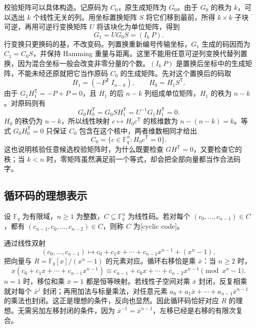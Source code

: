 \ProseParagraphBreak
校验矩阵可以具体构造。记原码为 \(C_0\)，原生成矩阵为 \(G_0\)。由于 \(G_0\) 的秩为 \(k\)，可以选出 \(k\) 个线性无关的列。用坐标置换矩阵 \(S\) 将它们移到最前，所得 \(k\times k\) 子块可逆，再用可逆行变换矩阵 \(U\) 将该块化为单位矩阵，得到
\[
	G_1=UG_0S=(I_k\ P).
\]
行变换只更换码的基，不改变码。列置换重新编号传输坐标，\(G_1\) 生成的码因而为 \(C_1=C_0S\)，并保持 Hamming 重量与距离。这里不能用任意可逆列变换代替列置换，因为混合坐标一般会改变非零分量的个数。\((I_k\ P)\) 是置换后坐标中的生成矩阵，不能未经还原就把它当作原码 \(C_0\) 的生成矩阵。先对这个置换后的码取
\[
	H_1=(-P^{\mathsf T}\ I_{n-k}),\qquad H_0=H_1S^{\mathsf T}.
\]
由于 \(G_1H_1^{\mathsf T}=-P+P=0\)，且 \(H_1\) 的后 \(n-k\) 列组成单位矩阵，\(H_1\) 的秩为 \(n-k\)。对原码则有
\[
	G_0H_0^{\mathsf T}=G_0SH_1^{\mathsf T}=U^{-1}G_1H_1^{\mathsf T}=0.
\]
\(H_0\) 的秩仍为 \(n-k\)，所以线性映射 \(c\mapsto H_0c^{\mathsf T}\) 的核维数为 \(n-(n-k)=k\)。等式 \(G_0H_0^{\mathsf T}=0\) 只保证 \(C_0\) 包含在这个核中，两者维数相同才给出
\[
	C_0=\{c\in\mathbb F_q^n:H_0c^{\mathsf T}=0\}.
\]
这也说明核验任意候选校验矩阵时，为什么既要检查 \(GH^{\mathsf T}=0\)，又要检查它的秩；当 \(k<n\) 时，零矩阵虽然满足前一个等式，却会把全部向量都当作合法码字。

\subsection{循环码的理想表示}
\label{b1:subsec:B02:02}

\begin{definition}\label{b1:def:B-cyclic-code}
	设 \(\mathbb F_q\) 为有限域，\(n\geq1\) 为整数，\(C\subseteq\mathbb F_q^n\) 为线性码。若对每个 \((c_0,\ldots,c_{n-1})\in C\)，都有 \((c_{n-1},c_0,\ldots,c_{n-2})\in C\)，则称 \(C\) 为[cyclic code]。
\end{definition}

通过线性双射
\[
	(c_0,\ldots,c_{n-1})\longmapsto c_0+c_1x+\cdots+c_{n-1}x^{n-1}+(x^n-1),
\]
把向量与 \(R=\mathbb F_q[x]/(x^n-1)\) 的元素对应。循环右移恰是乘 \(\bar x\)：当 \(n\geq2\) 时，
\[
	x(c_0+c_1x+\cdots+c_{n-1}x^{n-1}) \equiv c_{n-1}+c_0x+\cdots+c_{n-2}x^{n-1} \pmod{x^n-1}.
\]
\(n=1\) 时，移位和乘 \(\bar x=1\) 都是恒等映射。若线性子空间对乘 \(\bar x\) 封闭，反复相乘就对每个 \(\bar x^j\) 封闭；再用加法与标量乘法，对任意元素 \(a_0+a_1\bar x+\cdots+a_{n-1}\bar x^{n-1}\) 的乘法也封闭。这正是理想的条件，反向也显然。因此循环码恰好对应 \(R\) 的理想。无需另加左移封闭的条件，因为 \(\bar x^{-1}=\bar x^{n-1}\)，左移已经是右移的有限次复合。

